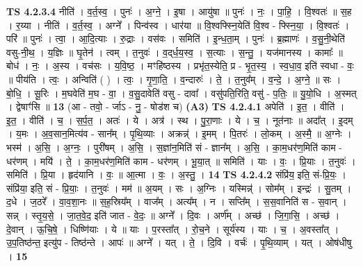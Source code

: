 \documentclass[17pt]{extarticle}
\begin{document}
                  \newline
                                \textbf{ TS 4.2.3.4} \newline
                  नीति॑ । व॒र्त॒स्व॒ । पुनः॑ । अ॒ग्ने॒ । इ॒षा । आयु॑षा ॥ पुनः॑ । नः॒ । पा॒हि॒ । वि॒श्वतः॑ ॥ स॒ह । र॒य्या । नीति॑ । व॒र्त॒स्व॒ । अग्ने᳚ । पिन्व॑स्व । धार॑या ॥ वि॒श्वफ्स्नि॒येति॑ वि॒श्व - फ्स्नि॒या॒ । वि॒श्वतः॑ । परि॑ ॥ पुनः॑ । त्वा॒ । आ॒दि॒त्याः । रु॒द्राः । वस॑वः । समिति॑ । इ॒न्ध॒ता॒म् । पुनः॑ । ब्र॒ह्माणः॑ । व॒सु॒नी॒थेति॑ वसु-नी॒थ॒ । य॒ज्ञिः ॥ घृ॒तेन॑ । त्वम् । त॒नुवः॑ । व॒द्‌र्ध॒य॒स्व॒ । स॒त्याः । स॒न्तु॒ । यज॑मानस्य । कामाः᳚ ॥ बोध॑ । नः॒ । अ॒स्य । वच॑सः । य॒वि॒ष्ठ॒ । मꣳहि॑ष्ठस्य । प्रभृ॑त॒स्येति॒ प्र - भृ॒त॒स्य॒ । स्व॒धा॒व॒ इति॑ स्वधा - वः॒ ॥ पीय॑ति । त्वः॒ । अन्विति॑ ( ) । त्वः॒ । गृ॒णा॒ति॒ । व॒न्दारुः॑ । ते॒ । त॒नुव᳚म् । व॒न्दे॒ । अ॒ग्ने॒ ॥ सः । बो॒धि॒ । सू॒रिः । म॒घवेति॑ म॒घ - वा॒ । व॒सु॒दावेति॑ वसु - दावा᳚ । वसु॑पति॒रिति॒ वसु॑ - प॒तिः॒ ॥ यु॒यो॒धि । अ॒स्मत् । द्वेषाꣳ॑सि ॥ \textbf{  13} \newline
                  \newline
                      (आ - तवो॒ - र्जाऽ - नु॒ - षोड॑श च)  \textbf{(A3)} \newline \newline
                                \textbf{ TS 4.2.4.1} \newline
                  अपेति॑ । इ॒त॒ । वीति॑ । इ॒त॒ । वीति॑ । च॒ । स॒र्प॒त॒ । अतः॑ । ये । अत्र॑ । स्थ । पु॒रा॒णाः । ये । च॒ । नूत॑नाः ॥ अदा᳚त् । इ॒दम् । य॒मः । अ॒व॒सान॒मित्य॑व - सान᳚म् । पृ॒थि॒व्याः । अक्रन्न्॑ । इ॒मम् । पि॒तरः॑ । लो॒कम् । अ॒स्मै॒ ॥ अ॒ग्नेः । भस्म॑ । अ॒सि॒ । अ॒ग्नः॒ । पुरी॑षम् । अ॒सि॒ । स॒ज्ञांन॒मिति॑ सं - ज्ञान᳚म् । अ॒सि॒ । का॒म॒धर॑ण॒मिति॑ काम - धर॑णम् । मयि॑ । ते॒ । का॒म॒धर॑ण॒मिति॑ काम - धर॑णम् । भू॒या॒त् ॥ समिति॑ । याः । वः॒ । प्रि॒याः । त॒नुवः॑ । समिति॑ । प्रि॒या । हृद॑यानि । वः॒ ॥ आ॒त्मा । वः॒ । अ॒स्तु॒ । \textbf{  14} \newline
                  \newline
                                \textbf{ TS 4.2.4.2} \newline
                  संप्रि॑य॒ इति॒ सं-प्रि॒यः॒ । संप्रि॑या॒ इति॒ सं - प्रि॒याः॒ । त॒नुवः॑ । मम॑ ॥ अ॒यम् । सः । अ॒ग्निः । यस्मिन्न्॑ । सोम᳚म् । इन्द्रः॑ । सु॒तम् । द॒धे । ज॒ठरे᳚ । वा॒व॒शा॒नः ॥ स॒ह॒स्रिय᳚म् । वाज᳚म् । अत्य᳚म् । न । सप्ति᳚म् । स॒स॒वानिति॑ स - स॒वान् । सन्न् । स्तृ॒य॒से॒ । जा॒त॒वे॒द॒ इति॑ जात - वे॒दः॒ ॥ अग्ने᳚ । दि॒वः । अर्ण᳚म् । अच्छ॑ । जि॒गा॒सि॒ । अच्छ॑ । दे॒वान् । ऊ॒चि॒षे॒ । धिष्णि॑याः । ये ॥ याः । प॒रस्ता᳚त् । रो॒च॒ने । सूर्य॑स्य । याः । च॒ । अ॒वस्ता᳚त् । उ॒प॒तिष्ठ॑न्त॒ इत्यु॑प - तिष्ठ॑न्ते । आपः॑ ॥ अग्ने᳚ । यत् । ते॒ । दि॒वि । वर्चः॑ । पृ॒थि॒व्याम् । यत् । ओष॑धीषु । \textbf{  15} \newline
\end{document}
